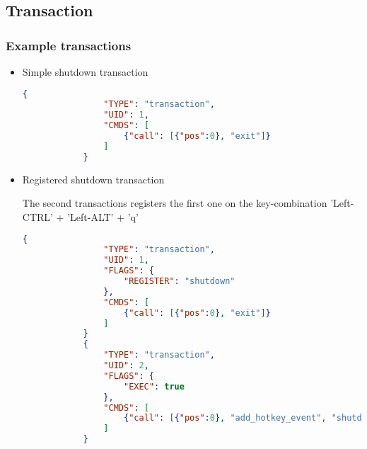 \subsection{Transaction}


\subsubsection{Example transactions}

\begin{itemize}
    \item Simple shutdown transaction

        \begin{lstlisting}[language=json]
            {
                "TYPE": "transaction",
                "UID": 1,
                "CMDS": [
                    {"call": [{"pos":0}, "exit"]}
                ]
            }
        \end{lstlisting}

    \item Registered shutdown transaction

        The second transactions registers the first one on the key-combination
        'Left-CTRL' + 'Left-ALT' + 'q'

        \begin{lstlisting}[language=json]
            {
                "TYPE": "transaction",
                "UID": 1,
                "FLAGS": {
                    "REGISTER": "shutdown"
                },
                "CMDS": [
                    {"call": [{"pos":0}, "exit"]}
                ]
            }
            {
                "TYPE": "transaction",
                "UID": 2,
                "FLAGS": {
                    "EXEC": true
                },
                "CMDS": [
                    {"call": [{"pos":0}, "add_hotkey_event", "shutdown", 29, 56, 16]}
                ]
            }
        \end{lstlisting}
\end{itemize}

